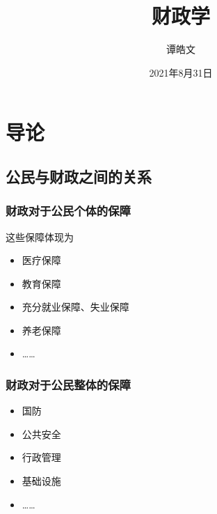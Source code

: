 \documentclass[
]{book}
\title{财政学}
\author{谭皓文}
\date{2021年8月31日}
\providecommand{\tightlist}{%
  \setlength{\itemsep}{0pt}\setlength{\parskip}{0pt}}
\begin{document}
\maketitle

{
\setcounter{tocdepth}{1}
\tableofcontents
}
\hypertarget{ux5bfcux8bba}{%
\chapter{导论}\label{ux5bfcux8bba}}

\hypertarget{ux516cux6c11ux4e0eux8d22ux653fux4e4bux95f4ux7684ux5173ux7cfb}{%
\section{公民与财政之间的关系}\label{ux516cux6c11ux4e0eux8d22ux653fux4e4bux95f4ux7684ux5173ux7cfb}}

\hypertarget{ux8d22ux653fux5bf9ux4e8eux516cux6c11ux4e2aux4f53ux7684ux4fddux969c}{%
\subsection{财政对于公民个体的保障}\label{ux8d22ux653fux5bf9ux4e8eux516cux6c11ux4e2aux4f53ux7684ux4fddux969c}}

这些保障体现为

\begin{itemize}
\tightlist
\item
  医疗保障
\item
  教育保障
\item
  充分就业保障、失业保障
\item
  养老保障
\item
  \ldots\ldots{}
\end{itemize}

\hypertarget{ux8d22ux653fux5bf9ux4e8eux516cux6c11ux6574ux4f53ux7684ux4fddux969c}{%
\subsection{财政对于公民整体的保障}\label{ux8d22ux653fux5bf9ux4e8eux516cux6c11ux6574ux4f53ux7684ux4fddux969c}}

\begin{itemize}
\tightlist
\item
  国防
\item
  公共安全
\item
  行政管理
\item
  基础设施
\item
  \ldots\ldots{}
\end{itemize}
\end{document}
